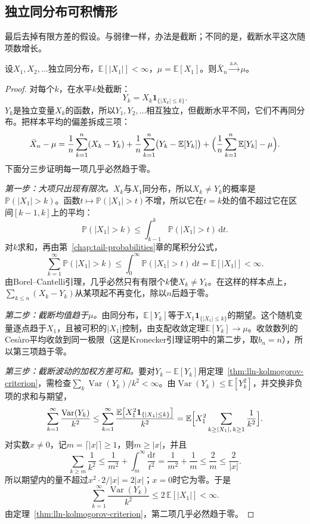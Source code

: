 \subsection{独立同分布可积情形}
\label{sec:lln-slln-integrable}

最后去掉有限方差的假设。与弱律一样，办法是截断；不同的是，截断水平这次随项数增长。

\begin{theorem}[强大数律]
\label{thm:lln-slln}
设$X_1,X_2,\dots$独立同分布，$\mathbb{E}[\lvert X_1\rvert]<\infty$，$\mu=\mathbb{E}[X_1]$。则$\bar{X}_n\xrightarrow{\mathrm{a.s.}}\mu$。
\end{theorem}

\begin{proof}
对每个$k$，在水平$k$处截断：
\[
 Y_k=X_k\mathbf{1}_{\{\lvert X_k\rvert\leq k\}} .
\]
$Y_k$是独立变量$X_k$的函数，所以$Y_1,Y_2,\dots$相互独立，但截断水平不同，它们不再同分布。把样本平均的偏差拆成三项：
\[
 \bar{X}_n-\mu=\frac1n\sum_{k=1}^{n}(X_k-Y_k)+\frac1n\sum_{k=1}^{n}\bigl(Y_k-\mathbb{E}[Y_k]\bigr)+\Bigl(\frac1n\sum_{k=1}^{n}\mathbb{E}[Y_k]-\mu\Bigr) .
\]
下面分三步证明每一项几乎必然趋于零。

\emph{第一步：大项只出现有限次。}$X_k$与$X_1$同分布，所以$X_k\neq Y_k$的概率是$\mathbb{P}(\lvert X_1\rvert>k)$。函数$t\mapsto\mathbb{P}(\lvert X_1\rvert>t)$不增，所以它在$t=k$处的值不超过它在区间$[k-1,k]$上的平均：
\[
 \mathbb{P}(\lvert X_1\rvert>k)\leq\int_{k-1}^{k}\mathbb{P}(\lvert X_1\rvert>t)\,\mathrm{d}t .
\]
对$k$求和，再由第~\ref{chap:tail-probabilities}章的尾积分公式，
\[
 \sum_{k=1}^{\infty}\mathbb{P}(\lvert X_1\rvert>k)\leq\int_0^{\infty}\mathbb{P}(\lvert X_1\rvert>t)\,\mathrm{d}t=\mathbb{E}[\lvert X_1\rvert]<\infty .
\]
由Borel–Cantelli引理，几乎必然只有有限个$k$使$X_k\neq Y_k$。在这样的样本点上，$\sum_{k\leq n}(X_k-Y_k)$从某项起不再变化，除以$n$后趋于零。

\emph{第二步：截断均值趋于$\mu$。}由同分布，$\mathbb{E}[Y_k]$等于$X_1\mathbf{1}_{\{\lvert X_1\rvert\leq k\}}$的期望。这个随机变量逐点趋于$X_1$，且被可积的$\lvert X_1\rvert$控制，由支配收敛定理$\mathbb{E}[Y_k]\to\mu$。收敛数列的Cesàro平均收敛到同一极限（这是Kronecker引理证明中的第二步，取$b_n=n$），所以第三项趋于零。

\emph{第三步：截断波动的加权方差可和。}要对$Y_k-\mathbb{E}[Y_k]$用定理~\ref{thm:lln-kolmogorov-criterion}，需检查$\sum_k\operatorname{Var}(Y_k)/k^2<\infty$。由$\operatorname{Var}(Y_k)\leq\mathbb{E}[Y_k^2]$，并交换非负项的求和与期望，
\[
 \sum_{k=1}^{\infty}\frac{\operatorname{Var}(Y_k)}{k^2}\leq\sum_{k=1}^{\infty}\frac{\mathbb{E}\bigl[X_1^2\mathbf{1}_{\{\lvert X_1\rvert\leq k\}}\bigr]}{k^2}=\mathbb{E}\Bigl[X_1^2\sum_{k\geq\lvert X_1\rvert,\,k\geq1}\frac{1}{k^2}\Bigr] .
\]
对实数$x\neq0$，记$m=\lceil\lvert x\rvert\rceil\geq1$，则$m\geq\lvert x\rvert$，并且
\[
 \sum_{k\geq m}\frac{1}{k^2}\leq\frac{1}{m^2}+\int_m^{\infty}\frac{\mathrm{d}t}{t^2}=\frac{1}{m^2}+\frac1m\leq\frac2m\leq\frac{2}{\lvert x\rvert} .
\]
所以期望内的量不超过$x^2\cdot2/\lvert x\rvert=2\lvert x\rvert$；$x=0$时它为零。于是
\[
 \sum_{k=1}^{\infty}\frac{\operatorname{Var}(Y_k)}{k^2}\leq2\,\mathbb{E}[\lvert X_1\rvert]<\infty .
\]
由定理~\ref{thm:lln-kolmogorov-criterion}，第二项几乎必然趋于零。


\end{proof}

